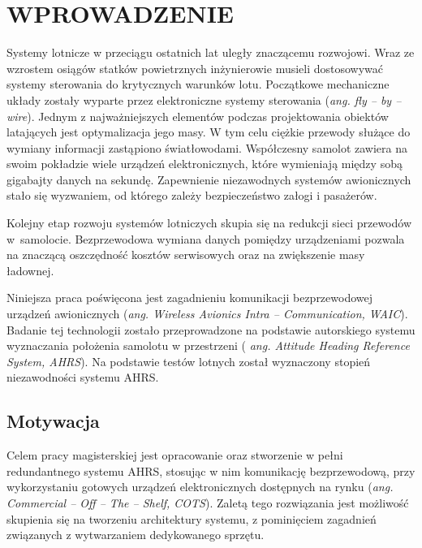 \documentclass[a4paper, 12pt, twoside]{article}
\begin{document}

\tableofcontents

\newpage
\justify

\vspace*{1.5 cm}
\section{WPROWADZENIE}
\vspace{3.0 cm}
Systemy lotnicze w przeciągu ostatnich lat uległy znaczącemu rozwojowi. Wraz ze wzrostem osiągów statków powietrznych inżynierowie musieli dostosowywać systemy sterowania do krytycznych warunków lotu. Początkowe mechaniczne układy zostały wyparte przez elektroniczne systemy sterowania (\textit {ang. fly -- by -- wire}). Jednym z najważniejszych elementów podczas projektowania obiektów latających jest optymalizacja jego masy. W tym celu ciężkie przewody służące do wymiany informacji zastąpiono światłowodami. Współczesny samolot zawiera na swoim pokładzie wiele urządzeń elektronicznych, które wymieniają między sobą gigabajty danych na sekundę. Zapewnienie niezawodnych systemów awionicznych stało się wyzwaniem, od którego zależy bezpieczeństwo załogi i pasażerów.

Kolejny etap rozwoju systemów lotniczych skupia się na redukcji sieci przewodów w~samolocie. Bezprzewodowa wymiana danych pomiędzy urządzeniami pozwala na znaczącą oszczędność kosztów serwisowych oraz na zwiększenie masy ładownej.

Niniejsza praca poświęcona jest zagadnieniu komunikacji bezprzewodowej urządzeń awionicznych (\textit {ang. Wireless Avionics Intra -- Communication, WAIC}). Badanie tej technologii zostało przeprowadzone na podstawie autorskiego systemu wyznaczania położenia samolotu w przestrzeni ( \textit {ang. Attitude Heading Reference System, AHRS}). Na podstawie testów lotnych został wyznaczony stopień niezawodności systemu AHRS.


\vspace{1.0 cm}
\subsection{Motywacja}
Celem pracy magisterskiej jest opracowanie oraz stworzenie w pełni redundantnego systemu AHRS, stosując w nim komunikację bezprzewodową, przy wykorzystaniu gotowych urządzeń elektronicznych dostępnych na rynku (\textit {ang. Commercial -- Off -- The -- Shelf, COTS}). Zaletą tego rozwiązania jest możliwość skupienia się na tworzeniu architektury systemu, z pominięciem zagadnień związanych z wytwarzaniem dedykowanego sprzętu. 
\end{document}
